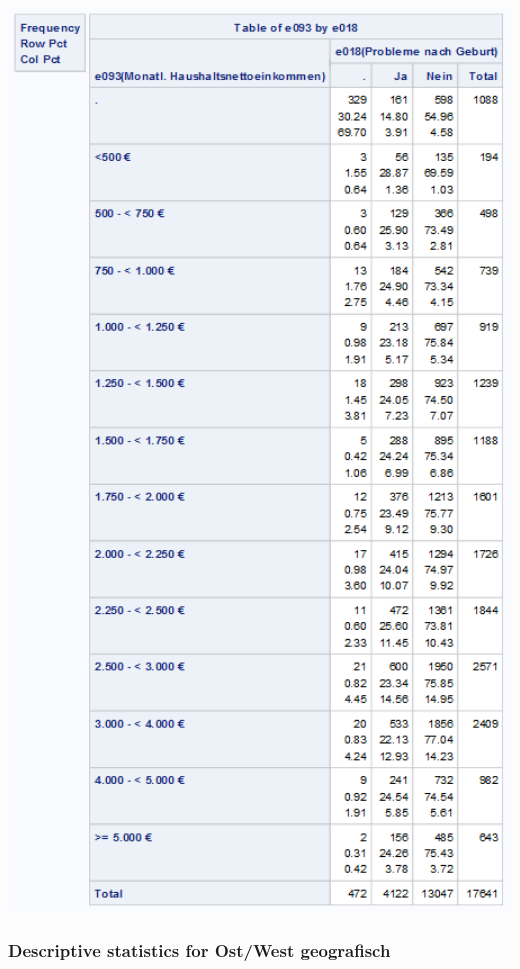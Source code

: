 \documentclass[
  10pt,
]{article}
\begin{document}
\includegraphics[width=6.22in]{./Yimeng_Plots/M7_0d}

\hypertarget{descriptive-statistics-for-ostwest-geografisch}{%
\subsubsection{Descriptive statistics for Ost/West
geografisch}\label{descriptive-statistics-for-ostwest-geografisch}}
\end{document}
